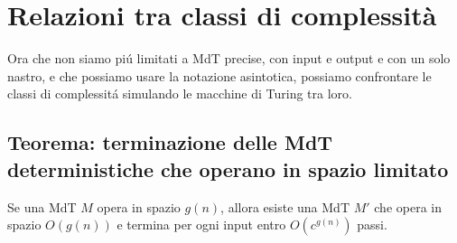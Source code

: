 \section{Relazioni tra classi di complessità}
Ora che non siamo piú limitati a MdT precise, con input e output e con un solo nastro, e che possiamo usare la notazione asintotica, possiamo confrontare le classi di complessitá simulando le macchine di Turing tra loro. \\

\subsection{Teorema: terminazione delle MdT deterministiche che operano in spazio limitato}
Se una MdT $M$ opera in spazio $g(n)$, allora esiste una MdT $M'$ che opera in spazio $O(g(n))$ e termina per ogni input entro $O(c^{g(n)})$ passi.
